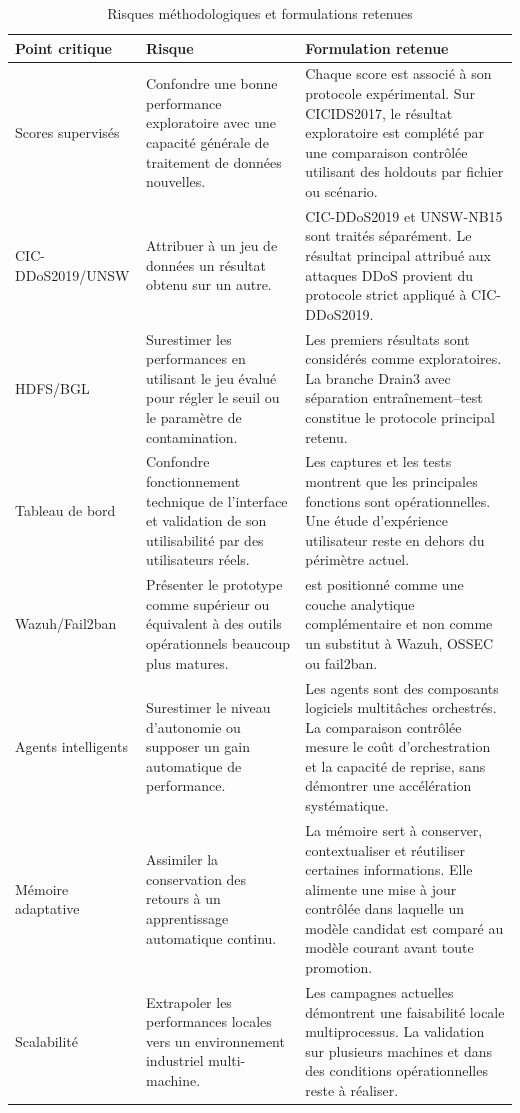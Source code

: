 \begin{table}[H]
\centering
\caption{Risques méthodologiques et formulations retenues}
\label{tab:risques-methodologiques}
\scriptsize

\begin{tabularx}{\textwidth}{p{3.2cm}p{4.2cm}X}
\toprule

\textbf{Point critique} &
\textbf{Risque} &
\textbf{Formulation retenue}
\tabularnewline

\midrule

Scores supervisés &
Confondre une bonne performance exploratoire avec une capacité générale de traitement de données nouvelles. &
Chaque score est associé à son protocole expérimental. Sur CICIDS2017, le résultat exploratoire est complété par une comparaison contrôlée utilisant des holdouts par fichier ou scénario.
\tabularnewline

CIC-DDoS2019/UNSW &
Attribuer à un jeu de données un résultat obtenu sur un autre. &
CIC-DDoS2019 et UNSW-NB15 sont traités séparément. Le résultat principal attribué aux attaques DDoS provient du protocole strict appliqué à CIC-DDoS2019.
\tabularnewline

HDFS/BGL &
Surestimer les performances en utilisant le jeu évalué pour régler le seuil ou le paramètre de contamination. &
Les premiers résultats sont considérés comme exploratoires. La branche Drain3 avec séparation entraînement--test constitue le protocole principal retenu.
\tabularnewline

Tableau de bord &
Confondre fonctionnement technique de l'interface et validation de son utilisabilité par des utilisateurs réels. &
Les captures et les tests montrent que les principales fonctions sont opérationnelles. Une étude d'expérience utilisateur reste en dehors du périmètre actuel.
\tabularnewline

Wazuh/Fail2ban &
Présenter le prototype comme supérieur ou équivalent à des outils opérationnels beaucoup plus matures. &
\logminer{} est positionné comme une couche analytique complémentaire et non comme un substitut à Wazuh, OSSEC ou fail2ban.
\tabularnewline

Agents intelligents &
Surestimer le niveau d'autonomie ou supposer un gain automatique de performance. &
Les agents sont des composants logiciels multitâches orchestrés. La comparaison contrôlée mesure le coût d'orchestration et la capacité de reprise, sans démontrer une accélération systématique.
\tabularnewline

Mémoire adaptative &
Assimiler la conservation des retours à un apprentissage automatique continu. &
La mémoire sert à conserver, contextualiser et réutiliser certaines informations. Elle alimente une mise à jour contrôlée dans laquelle un modèle candidat est comparé au modèle courant avant toute promotion.
\tabularnewline

Scalabilité &
Extrapoler les performances locales vers un environnement industriel multi-machine. &
Les campagnes actuelles démontrent une faisabilité locale multiprocessus. La validation sur plusieurs machines et dans des conditions opérationnelles reste à réaliser.
\tabularnewline

\bottomrule
\end{tabularx}
\end{table}

